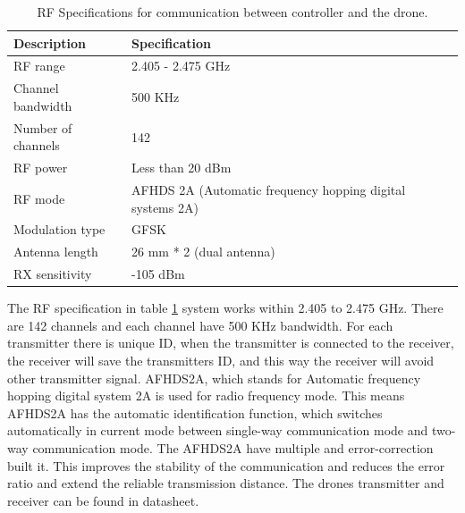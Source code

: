 \begin{table}[H] 
\caption{RF Specifications for communication between controller and the drone.} \label{tab:RFSpec}
\centering
\begin{tabular}{|l|m{9cm}|}
\hline
\textbf{Description}  & \textbf{Specification}                                    \\ \hline
RF range              & 2.405 - 2.475 GHz                                         \\ \hline
Channel bandwidth     & 500 KHz                                                   \\ \hline
Number of channels    & 142                                                       \\ \hline
RF power              & Less than 20 dBm                                          \\ \hline
RF mode               & AFHDS 2A (Automatic frequency hopping digital systems 2A) \\ \hline
Modulation type       & GFSK                                                      \\ \hline
Antenna length        & 26 mm * 2 (dual antenna)                                  \\ \hline
RX sensitivity        & -105 dBm                                                  \\ \hline
\end{tabular}
\end{table}

The RF specification in table \ref{tab:RFSpec} system works within 2.405 to 2.475 GHz. There are 142 channels and each channel have 500 KHz bandwidth. For each transmitter there is unique ID, when the transmitter is connected to the receiver, the receiver will save the transmitters ID, and this way the receiver will avoid other transmitter signal.
AFHDS2A, which stands for Automatic frequency hopping digital system 2A is used for radio frequency mode. This means AFHDS2A has the automatic identification function, which switches automatically in current mode between single-way communication mode and two-way communication mode. The AFHDS2A have multiple and error-correction built it. This improves the stability of the communication and reduces the error ratio and extend the reliable transmission distance. The drones transmitter and receiver can be found in datasheet.


